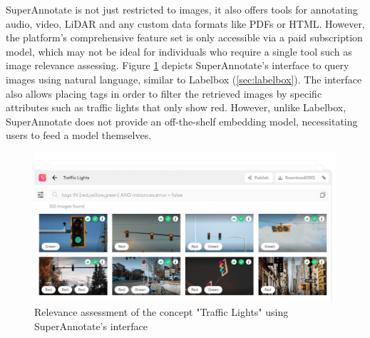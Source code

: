\documentclass{l4proj}
\begin{document}
SuperAnnotate is not just restricted to images, it also offers tools for annotating audio, video, LiDAR and any custom data formats like PDFs or HTML. However, the platform's comprehensive feature set is only accessible via a paid subscription model, which may not be ideal for individuals who require a single tool such as image relevance assessing. Figure \ref{fig:superannotate_interface} depicts SuperAnnotate's interface to query images using natural language, similar to Labelbox (\ref{sec:labelbox}). The interface also allows placing tags in order to filter the retrieved images by specific attributes such as traffic lights that only show red. However, unlike Labelbox, SuperAnnotate does not provide an off-the-shelf embedding model, necessitating users to feed a model themselves.

\begin{figure}[h]
    \centering
    \includegraphics[width=1\textwidth]{figures/superannotate_interface.pdf}
    \caption{Relevance assessment of the concept "Traffic Lights" using SuperAnnotate's interface}
    \label{fig:superannotate_interface}
\end{figure}


\end{document}
